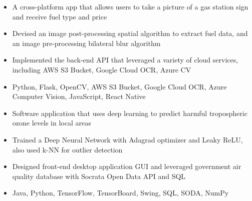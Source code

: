 \documentclass[11pt,letterpaper]{article}
\begin{document}
  \ifmilesnap
    {\fontsize{12}{12}}

    \begin{itemize}
      \item{A cross-platform app that allows users to take a picture of a gas station sign and receive fuel type and price}

      \item{Devised an image post-processing spatial algorithm to extract fuel data, and an image pre-processing bilateral blur algorithm}

      \item{Implemented the back-end API that leveraged a variety of cloud services, including AWS S3 Bucket, Google Cloud OCR, Azure CV}

      \item{
        {}
        Python, Flask, OpenCV, AWS S3 Bucket, Google Cloud OCR, Azure Computer Vision, JavaScript, React Native
      }
    \end{itemize}
  \fi

  \ifdeeplearningfortroposphericozoneprediction
    {\fontsize{12}{12}}

    \begin{itemize}
      \item{Software application that uses deep learning to predict harmful tropospheric ozone levels in local areas}

      \item{Trained a Deep Neural Network with Adagrad optimizer and Leaky ReLU, also used k-NN for outlier detection}

      \item{Designed front-end desktop application GUI and leveraged government air quality database with Socrata Open Data API and SQL}

      \item{
        {}
        Java, Python, TensorFlow, TensorBoard, Swing, SQL, SODA, NumPy
      }
    \end{itemize}
  \fi

  \smallskip


\end{document}
